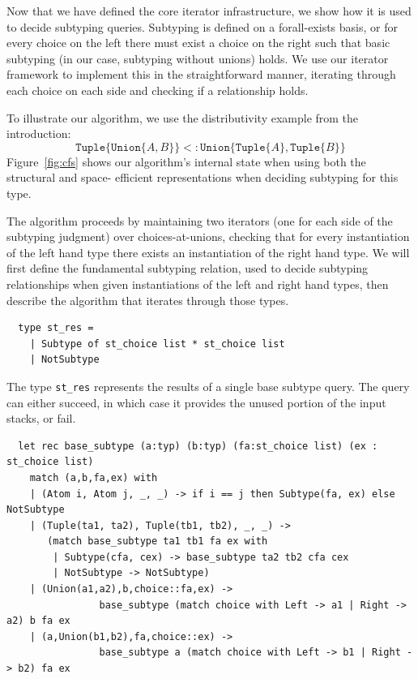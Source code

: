 \documentclass[a4paper,english]{lipics-v2019}
\newcommand{\xt}[1]{\texttt{#1}}
\newcommand{\union}[2]{\xt{Union\{}#1,#2\xt{\}}}
\newcommand{\tuple}[1]{\xt{Tuple\{}#1\xt{\}}}
\begin{document}
Now that we have defined the core iterator infrastructure, we show how it
is used to decide subtyping queries. Subtyping is defined on a forall-exists
basis, or for every choice on the left there must exist a choice on the right
such that basic subtyping (in our case, subtyping without unions) holds. We
use our iterator framework to implement this in the straightforward manner, 
iterating through each choice on each side and checking if a relationship holds.

To illustrate our algorithm, we use the  distributivity example from the
introduction: $$\tuple{\union{A}{B}} <: \union{\tuple{A}}{\tuple{B}}$$
Figure~\ref{fig:cfs} shows our algorithm's internal state when using  both the
structural and space- efficient representations when deciding subtyping for
this type.

The algorithm proceeds by maintaining two iterators (one for each side of the subtyping judgment) over choices-at-unions,  
checking that for every instantiation of the left hand type there
exists an instantiation of the right hand type. We will first define the
fundamental subtyping relation, used to decide subtyping relationships when
given instantiations of the left and right hand types, then describe the
algorithm that iterates through those types.

\begin{small}
\begin{verbatim}
  type st_res =
    | Subtype of st_choice list * st_choice list
    | NotSubtype
\end{verbatim}
\end{small}

The type \verb|st_res| represents the results of a single base subtype query. The query
can either succeed, in which case it provides the unused portion of the input
stacks, or fail. 

\begin{small}
\begin{verbatim}
  let rec base_subtype (a:typ) (b:typ) (fa:st_choice list) (ex : st_choice list)
    match (a,b,fa,ex) with
    | (Atom i, Atom j, _, _) -> if i == j then Subtype(fa, ex) else NotSubtype
    | (Tuple(ta1, ta2), Tuple(tb1, tb2), _, _) ->
       (match base_subtype ta1 tb1 fa ex with
        | Subtype(cfa, cex) -> base_subtype ta2 tb2 cfa cex
        | NotSubtype -> NotSubtype)
    | (Union(a1,a2),b,choice::fa,ex) -> 
                base_subtype (match choice with Left -> a1 | Right -> a2) b fa ex
    | (a,Union(b1,b2),fa,choice::ex) -> 
                base_subtype a (match choice with Left -> b1 | Right -> b2) fa ex
\end{verbatim}
\end{small}
\end{document}
